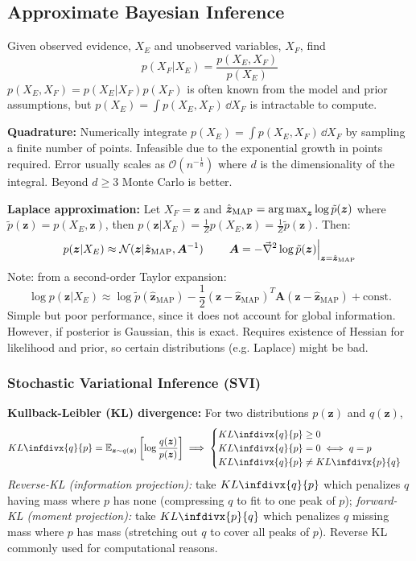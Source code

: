 \documentclass[twocolumn, 8pt]{extarticle}
\begin{document}
\subsection{Approximate Bayesian Inference}

Given observed evidence, \(X_E\) and unobserved variables, \(X_F\), find
\[p(X_F | X_E) = \frac{p(X_E, X_F)}{p(X_E)}\]
\(p(X_E, X_F) = p(X_E | X_F)p(X_F)\) is often known from the model and prior assumptions,
but \(p(X_E) = \int p(X_E, X_F)\,\dd X_F\) is intractable to compute.

\textbf{Quadrature:} Numerically integrate \(p(X_E) = \int p(X_E, X_F)\,\dd X_F\) by sampling a finite number of points.
Infeasible due to the exponential growth in points required. Error usually scales as \(\mathcal O(n^{-\frac{1}{d}})\)
where \(d\) is the dimensionality of the integral. Beyond \(d \geq 3\) Monte Carlo is better.

\textbf{Laplace approximation:} Let \(X_F = \bm z\) and \(\hat{\bm z}_\text{MAP} = \operatorname*{arg\,max} _{\bm z} \log\tilde p(\bm z)\)
where \(\tilde p(\bm z) = p(X_E, \bm z)\), then \(p(\bm z | X_E) = \frac{1}{Z}p(X_E, \bm z) = \frac{1}{Z}\tilde p(\bm z)\).
Then:
\[
    p(\bm z | X_E) \approx \mathcal N(\bm z | \hat{\bm z}_\text{MAP}, \bm A^{-1})
    \qquad \left.\bm A = -\vec\nabla^2\log\tilde p(\bm z)\right\rvert_{\bm z = \hat{\bm z}_\text{MAP}}
\]
Note: from a second-order Taylor expansion:
\[
    \log p(\bm z | X_E) \approx \log \tilde p(\hat{\bm z}_\text{MAP})
    - \frac{1}{2}(\bm z - \hat{\bm z}_\text{MAP})^T\bm A(\bm z - \hat{\bm z}_\text{MAP}) + \text{const.}
\]
Simple but poor performance, since it does not account for global information.
However, if posterior is Gaussian, this is exact.
Requires existence of Hessian for likelihood and prior, so certain distributions (e.g. Laplace) might be bad.
    
\subsubsection{Stochastic Variational Inference (SVI)}

\textbf{Kullback-Leibler (KL) divergence:} For two distributions \(p(\bm z)\) and \(q(\bm z)\),
\[
    KL\infdivx{q}{p} = \mathbb E_{\bm z \sim q(\bm z)}\left[\log\frac{q(\bm z)}{p(\bm z)}\right]
    \implies \begin{cases}
        KL\infdivx{q}{p} \geq 0 \\
        KL\infdivx{q}{p} = 0 \iff q = p \\
        KL\infdivx{q}{p} \neq KL\infdivx{p}{q} \\
    \end{cases}
\]
\textit{Reverse-KL (information projection):} take \(KL\infdivx{q}{p}\) which penalizes \(q\) having mass where \(p\)
has none (compressing \(q\) to fit to one peak of \(p\)); \textit{forward-KL (moment projection):} take
\(KL\infdivx{p}{q}\) which penalizes \(q\) missing mass where \(p\) has mass (stretching out \(q\) to cover all peaks of
\(p\)). Reverse KL commonly used for computational reasons.
\end{document}
